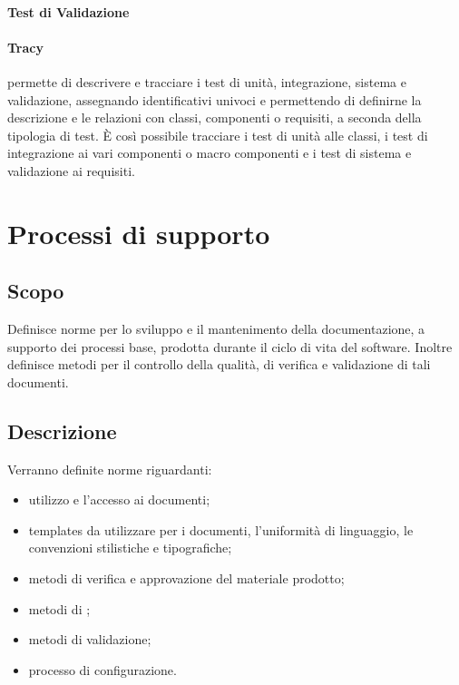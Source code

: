 \documentclass[12pt,a4paper]{article}
\begin{document}
\paragraph{Test di Validazione}
\TODO{}


\paragraph{Tracy}
\TODO{}
 permette di descrivere e tracciare i test di unità, integrazione, sistema e validazione, assegnando identificativi univoci e permettendo di definirne la descrizione e le relazioni con classi, componenti o requisiti, a seconda della tipologia di test. È così possibile tracciare i test di unità alle classi, i test di integrazione ai vari componenti o macro componenti e i test di sistema e validazione ai requisiti.

\newpage

\section{Processi di supporto}

\subsection{Scopo}
Definisce norme per lo sviluppo e il mantenimento della documentazione, a supporto dei processi base, prodotta durante il ciclo di vita del software. Inoltre definisce metodi per il controllo della qualità, di verifica e validazione di tali documenti.

\subsection{Descrizione}
Verranno definite norme riguardanti:
\begin{itemize}
	\item utilizzo e l'accesso ai documenti;
	\item templates da utilizzare per i documenti, l'uniformità di linguaggio, le convenzioni stilistiche e tipografiche;
	\item metodi di verifica e approvazione del materiale prodotto;
	\item metodi di ;
	\item metodi di validazione;
	\item processo di configurazione.
\end{itemize}
\end{document}

